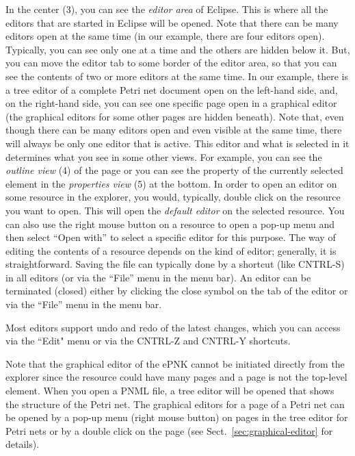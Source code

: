 In the center (3), you can see the \emph{editor area} of Eclipse. This is%
where all the editors that are started in Eclipse will be opened. Note that
there can be many editors open at the same time (in our example, there are four
editors open). Typically, you can see only one at a time and the others are
hidden below it. But, you can move the editor tab to some border of the editor
area, so that you can see the contents
of two or more editors at the same time. In our example, there is
a tree editor of a complete Petri net document open on the left-hand
side, and, on the right-hand side, you can see one specific page open
in a graphical editor (the graphical editors for some other pages are hidden
beneath). Note that, even though there can be many editors open and even visible
at the same time, there will always be only one editor that is active. This
editor and what is selected in it determines what you see in some other
views. For example, you can see the \emph{outline view} (4)%
of the page or you can see the
property of the currently selected element in the \emph{properties view} (5)%
at the bottom.  In order to open an editor on some resource in the explorer,
you would, typically, double click on the resource you want to open. This will open
the \emph{default editor}%
on the selected resource. You can also use the right mouse button on a resource
to open a pop-up menu and then select ``Open with'' 
to select a specific editor for this purpose. The way of editing the contents
of a resource depends on the kind of editor; generally, it is straightforward.
Saving the file can typically done by a shortcut (like CNTRL-S) in all 
editors (or via the ``File'' menu in the menu bar).
An editor can be terminated (closed) either by clicking the close
symbol on the tab of the editor or via the ``File'' menu in the menu bar.

Most editors support undo and redo of the latest changes, which you can
access via the ``Edit" menu or via the CNTRL-Z and CNTRL-Y shortcuts.

Note that the graphical editor of the ePNK cannot be initiated directly from
the explorer since the resource could have many pages and a page is
not the top-level element. When you open a PNML file, a tree editor
will be opened that shows the structure of the Petri net. The graphical
editors for a page of a Petri net can be opened by a pop-up menu (right
mouse button) on pages in the tree editor for Petri nets or by a double
click on the page (see Sect.~\ref{sec:graphical-editor} for details).

